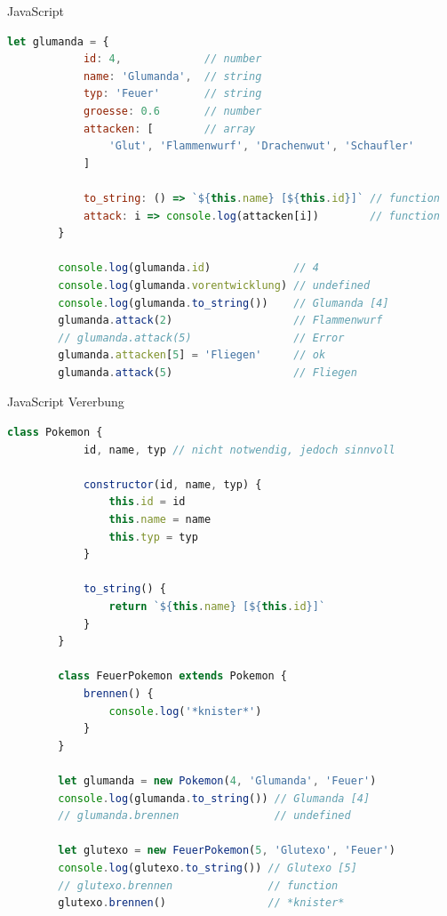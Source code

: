 \begin{example}{JavaScript}
    \begin{lstlisting}[language=JavaScript]
        let glumanda = {
            id: 4,             // number
            name: 'Glumanda',  // string
            typ: 'Feuer'       // string
            groesse: 0.6       // number
            attacken: [        // array
                'Glut', 'Flammenwurf', 'Drachenwut', 'Schaufler'
            ]

            to_string: () => `${this.name} [${this.id}]` // function
            attack: i => console.log(attacken[i])        // function
        }

        console.log(glumanda.id)             // 4
        console.log(glumanda.vorentwicklung) // undefined
        console.log(glumanda.to_string())    // Glumanda [4]
        glumanda.attack(2)                   // Flammenwurf
        // glumanda.attack(5)                // Error
        glumanda.attacken[5] = 'Fliegen'     // ok
        glumanda.attack(5)                   // Fliegen
    \end{lstlisting}
\end{example}

\begin{example}{JavaScript Vererbung}
    \begin{lstlisting}[language=JavaScript]
        class Pokemon {
            id, name, typ // nicht notwendig, jedoch sinnvoll

            constructor(id, name, typ) {
                this.id = id
                this.name = name
                this.typ = typ
            }

            to_string() {
                return `${this.name} [${this.id}]`
            }
        }

        class FeuerPokemon extends Pokemon {
            brennen() {
                console.log('*knister*')
            }
        }

        let glumanda = new Pokemon(4, 'Glumanda', 'Feuer')
        console.log(glumanda.to_string()) // Glumanda [4]
        // glumanda.brennen               // undefined

        let glutexo = new FeuerPokemon(5, 'Glutexo', 'Feuer')
        console.log(glutexo.to_string()) // Glutexo [5]
        // glutexo.brennen               // function
        glutexo.brennen()                // *knister*
    \end{lstlisting}
\end{example}

